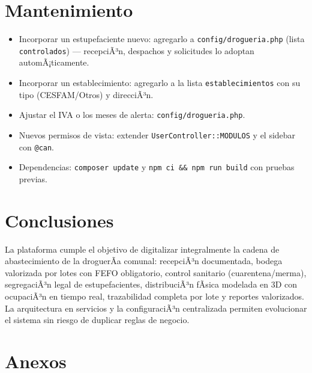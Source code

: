 ﻿\documentclass[a4paper, 12pt]{article}
\begin{document}
\section{Mantenimiento}
\begin{itemize}
    \item Incorporar un estupefaciente nuevo: agregarlo a \texttt{config/drogueria.php} (lista \texttt{controlados}) --- recepciÃ³n, despachos y solicitudes lo adoptan automÃ¡ticamente.
    \item Incorporar un establecimiento: agregarlo a la lista \texttt{establecimientos} con su tipo (CESFAM/Otros) y direcciÃ³n.
    \item Ajustar el IVA o los meses de alerta: \texttt{config/drogueria.php}.
    \item Nuevos permisos de vista: extender \texttt{UserController::MODULOS} y el sidebar con \texttt{@can}.
    \item Dependencias: \texttt{composer update} y \texttt{npm ci \&\& npm run build} con pruebas previas.
\end{itemize}

\section{Conclusiones}
La plataforma cumple el objetivo de digitalizar integralmente la cadena de abastecimiento de la droguerÃ­a comunal: recepciÃ³n documentada, bodega valorizada por lotes con FEFO obligatorio, control sanitario (cuarentena/merma), segregaciÃ³n legal de estupefacientes, distribuciÃ³n fÃ­sica modelada en 3D con ocupaciÃ³n en tiempo real, trazabilidad completa por lote y reportes valorizados. La arquitectura en servicios y la configuraciÃ³n centralizada permiten evolucionar el sistema sin riesgo de duplicar reglas de negocio.

\section{Anexos}
\end{document}
